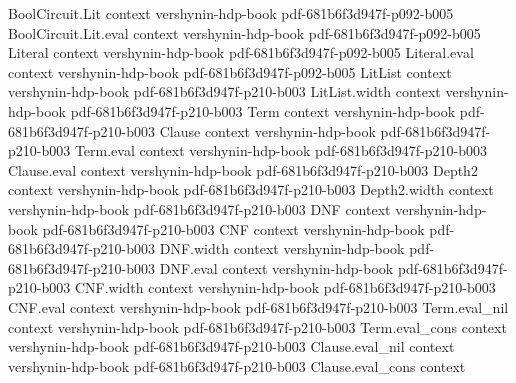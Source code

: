 \begin{theorem}
\label{BooleanAnalysis.GaussianSpace.MaxCut.integral_gaussianRounding}
\leanok
{}
\proofstep
  {BoolCircuit.Lit}
  {context}
  {vershynin-hdp-book}
  {pdf-681b6f3d947f-p092-b005}
\proofstep
  {BoolCircuit.Lit.eval}
  {context}
  {vershynin-hdp-book}
  {pdf-681b6f3d947f-p092-b005}
\proofstep
  {Literal}
  {context}
  {vershynin-hdp-book}
  {pdf-681b6f3d947f-p092-b005}
\proofstep
  {Literal.eval}
  {context}
  {vershynin-hdp-book}
  {pdf-681b6f3d947f-p092-b005}
\proofstep
  {LitList}
  {context}
  {vershynin-hdp-book}
  {pdf-681b6f3d947f-p210-b003}
\proofstep
  {LitList.width}
  {context}
  {vershynin-hdp-book}
  {pdf-681b6f3d947f-p210-b003}
\proofstep
  {Term}
  {context}
  {vershynin-hdp-book}
  {pdf-681b6f3d947f-p210-b003}
\proofstep
  {Clause}
  {context}
  {vershynin-hdp-book}
  {pdf-681b6f3d947f-p210-b003}
\proofstep
  {Term.eval}
  {context}
  {vershynin-hdp-book}
  {pdf-681b6f3d947f-p210-b003}
\proofstep
  {Clause.eval}
  {context}
  {vershynin-hdp-book}
  {pdf-681b6f3d947f-p210-b003}
\proofstep
  {Depth2}
  {context}
  {vershynin-hdp-book}
  {pdf-681b6f3d947f-p210-b003}
\proofstep
  {Depth2.width}
  {context}
  {vershynin-hdp-book}
  {pdf-681b6f3d947f-p210-b003}
\proofstep
  {DNF}
  {context}
  {vershynin-hdp-book}
  {pdf-681b6f3d947f-p210-b003}
\proofstep
  {CNF}
  {context}
  {vershynin-hdp-book}
  {pdf-681b6f3d947f-p210-b003}
\proofstep
  {DNF.width}
  {context}
  {vershynin-hdp-book}
  {pdf-681b6f3d947f-p210-b003}
\proofstep
  {DNF.eval}
  {context}
  {vershynin-hdp-book}
  {pdf-681b6f3d947f-p210-b003}
\proofstep
  {CNF.width}
  {context}
  {vershynin-hdp-book}
  {pdf-681b6f3d947f-p210-b003}
\proofstep
  {CNF.eval}
  {context}
  {vershynin-hdp-book}
  {pdf-681b6f3d947f-p210-b003}
\proofstep
  {Term.eval_nil}
  {context}
  {vershynin-hdp-book}
  {pdf-681b6f3d947f-p210-b003}
\proofstep
  {Term.eval_cons}
  {context}
  {vershynin-hdp-book}
  {pdf-681b6f3d947f-p210-b003}
\proofstep
  {Clause.eval_nil}
  {context}
  {vershynin-hdp-book}
  {pdf-681b6f3d947f-p210-b003}
\proofstep
  {Clause.eval_cons}
  {context}

\end{theorem}

